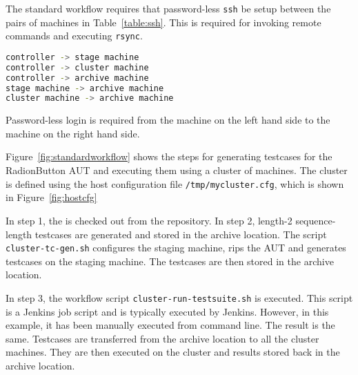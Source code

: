 The standard workflow requires that password-less \texttt{ssh} be setup between the pairs of machines in Table~\ref{table:ssh}. This is required for invoking remote commands and executing \texttt{rsync}.

\begin{table}
\scriptsize{
\begin{lstlisting}[language=sh]
controller -> stage machine
controller -> cluster machine
controller -> archive machine
stage machine -> archive machine
cluster machine -> archive machine
\end{lstlisting}
}
\caption{Password-less login is required from the machine on the left hand side to the machine on the right hand side.}
\label{table:ssh}
\end{table}

Figure~\ref{fig:standardworkflow} shows the steps for generating testcases for the RadionButton AUT and executing them using a cluster of machines. The cluster is defined using the host configuration file \texttt{/tmp/mycluster.cfg}, which is shown in Figure~\ref{fig:hostcfg}

In step 1, the \mddozen{} is checked out from the repository. In step 2, length-2 sequence-length testcases are generated and stored in the archive location. The script \texttt{cluster-tc-gen.sh} configures the staging machine, rips the AUT and generates testcases on the staging machine. The testcases are then stored in the archive location.

In step 3, the workflow script \texttt{cluster-run-testsuite.sh} is executed. This script is a Jenkins job script and is typically executed by Jenkins. However, in this example, it has been manually executed from command line. The result is the same. Testcases are transferred from the archive location to all the cluster machines. They are then executed on the cluster and results stored back in the archive location.
